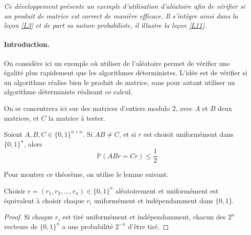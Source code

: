 
\textit{Ce développement présente un exemple d'utilisation d'aléatoire afin de vérifier si un produit de matrice est correct de manière efficace. Il s'intègre ainsi dans la leçon \ref{L3} et de part sa nature probabiliste, il illustre la leçon \ref{L11}. }


\paragraph{Introduction.} On considère ici un exemple où utiliser de l'aléatoire permet de vérifier une égalité plus rapidement que les algorithmes déterministes. L'idée est de vérifier si un algorithme réalise bien le produit de matrice, sans pour autant utiliser un algorithme déterministe réalisant ce calcul.

On se concentrera ici sur des matrices d'entiers modulo 2, avec $A$ et $B$ deux matrices, et $C$ la matrice à tester.

\begin{theorem}\label{ThmVerif}
Soient $A,B,C\in \{0,1\}^{n\times n}$. Si $AB\neq C$, et si $r$ est choisit uniformément dans $\{0,1\}^n$, alors 
$$
\mathbb{P}(ABr =Cr) \leq \frac{1}{2}
$$
\end{theorem}

Pour montrer ce théorème, on utilise le lemme suivant.

\begin{lemma}
Choisir $r=(r_1, r_2,...,r_n) \in \{0,1\}^n$ aléatoirement et uniformément est équivalent à choisir chaque $r_i$ uniformément et indépendamment dans $\{0,1\}$.
\end{lemma}

\begin{proof}
Si chaque $r_i$ est tiré uniformément et indépendamment, chacun des $2^n$ vecteurs de $\{0,1\}^n$ a une probabilité $2^{-n}$ d'être tiré.
\end{proof}

